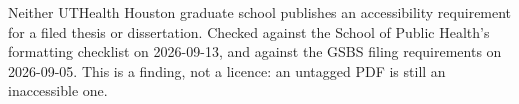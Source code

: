 %
%
%
%



	{Neither UTHealth Houston graduate school publishes an accessibility
	 requirement for a filed thesis or dissertation. Checked against the School
	 of Public Health's formatting checklist on 2026-09-13, and against the
	 GSBS filing requirements on 2026-09-05. This is a finding, not a licence:
	 an untagged PDF is still an inaccessible one.}

